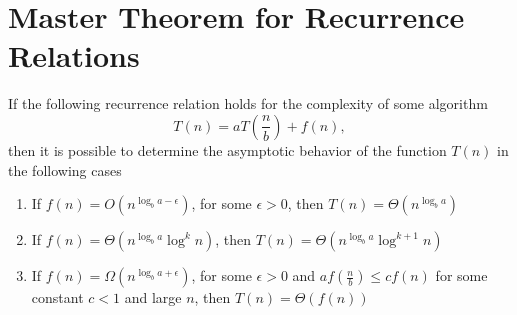 \section{Master Theorem for Recurrence Relations}

\begin{theorem}
\label{addAlgoMasterTheorem}
If the following recurrence relation holds for the complexity
of some algorithm
\[
T\left( n \right ) = a T \left( \frac{n}{b} \right) + f\left( n \right ),
\]
then it is possible to determine the asymptotic behavior of the function 
$T\left( n\right ) $ in the following cases
\begin{enumerate}
\item If $f\left(n\right) = O\left( n^{\log_b a - \epsilon}\right)$,
  for some $\epsilon > 0$, then 
$T\left(n\right) = \Theta\left(n^{\log_b a}\right)$
\item If 
$f\left(n\right) = \Theta\left( n^{\log_b a}\log^{k} n\right)$, then 
$T\left(n\right) = \Theta\left(n^{\log_b a}\log^{k + 1} n\right)$
\item If $f\left(n\right) = \Omega\left( n^{\log_b a + \epsilon}\right)$,
  for some $\epsilon > 0$ and $a f\left(\frac{n}{b}\right) \le c f
  \left( n \right)$ for some constant $c < 1$ and large $n$, then 
$T\left(n\right) = \Theta\left(f\left(n\right)\right)$
\end{enumerate}
\end{theorem}